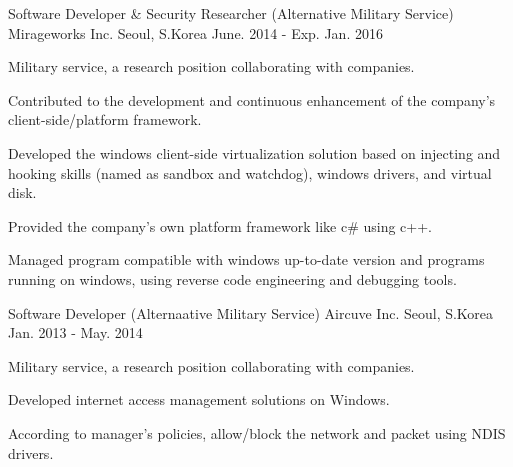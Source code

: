 \begin{cventries}
  \cventry
    {Software Developer \& Security Researcher (Alternative Military Service)}
    {Mirageworks Inc.}
    {Seoul, S.Korea}
    {June. 2014 - Exp. Jan. 2016}
    {
      \begin{cvitems}
        \item {Military service, a research position collaborating with companies.}
        \item {Contributed to the development and continuous enhancement of the company's client-side/platform framework.}
        \item {Developed the windows client-side virtualization solution based on injecting and hooking skills (named as sandbox and watchdog), windows drivers, and virtual disk.}
        \item {Provided the company's own platform framework like c\# using c++.}
        \item {Managed program compatible with windows up-to-date version and programs running on windows, using reverse code engineering and debugging tools.}
      \end{cvitems}
    }
  \cventry
    {Software Developer (Alternaative Military Service)}
    {Aircuve Inc.}
    {Seoul, S.Korea}
    {Jan. 2013 - May. 2014}
    {
      \begin{cvitems}
        \item {Military service, a research position collaborating with companies.}
        \item {Developed internet access management solutions on Windows.}
        \item {According to manager's policies, allow/block the network and packet using NDIS drivers.}

\end{cvitems}}
\end{cventries}
